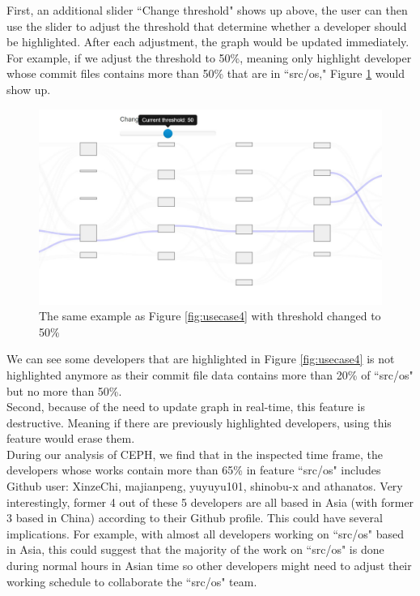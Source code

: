 \documentclass{article}
\begin{document}
First, an additional slider ``Change threshold" shows up above, the user can then use the slider to adjust the threshold that determine whether a developer should be highlighted. After each adjustment, the graph would be updated immediately. For example, if we adjust the threshold to 50\%, meaning only highlight developer whose commit files contains more than 50\% that are in ``src/os," Figure \ref{fig:usecase4-2} would show up.
\begin{figure}[h!]
\centering
\includegraphics[scale=0.6]{images/usecase4-2.JPG}
\caption{The same example as Figure \ref{fig:usecase4} with threshold changed to 50\%}
\label{fig:usecase4-2}
\end{figure}
We can see some developers that are highlighted in Figure \ref{fig:usecase4} is not highlighted anymore as their commit file data contains more than 20\% of ``src/os" but no more than 50\%.\\
Second, because of the need to update graph in real-time, this feature is destructive. Meaning if there are previously highlighted developers, using this feature would erase them.\\
During our analysis of CEPH, we find that in the inspected time frame, the developers whose works contain more than 65\% in feature ``src/os" includes Github user: XinzeChi, majianpeng, yuyuyu101, shinobu-x and athanatos. Very interestingly, former 4 out of these 5 developers are all based in Asia (with former 3 based in China) according to their Github profile. This could have several implications. For example, with almost all developers working on ``src/os" based in Asia, this could suggest that the majority of the work on ``src/os" is done during normal hours in Asian time so other developers might need to adjust their working schedule to collaborate the ``src/os" team.
\end{document}
